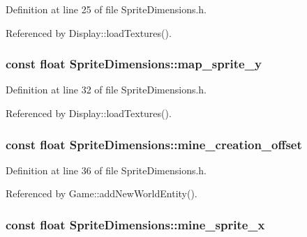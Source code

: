 Definition at line 25 of file Sprite\-Dimensions.\-h.



Referenced by Display\-::load\-Textures().

\hypertarget{classSpriteDimensions_a33014d94b303afe312e1a4b2fb5e437f}{
\subsubsection[{map\-\_\-sprite\-\_\-y}]{\setlength{\rightskip}{0pt plus 5cm}const float Sprite\-Dimensions\-::map\-\_\-sprite\-\_\-y}}\label{classSpriteDimensions_a33014d94b303afe312e1a4b2fb5e437f}


Definition at line 32 of file Sprite\-Dimensions.\-h.



Referenced by Display\-::load\-Textures().

\hypertarget{classSpriteDimensions_a01c7c9dc1498f3336671b1ca697a7342}{
\subsubsection[{mine\-\_\-creation\-\_\-offset}]{\setlength{\rightskip}{0pt plus 5cm}const float Sprite\-Dimensions\-::mine\-\_\-creation\-\_\-offset}}\label{classSpriteDimensions_a01c7c9dc1498f3336671b1ca697a7342}


Definition at line 36 of file Sprite\-Dimensions.\-h.



Referenced by Game\-::add\-New\-World\-Entity().

\hypertarget{classSpriteDimensions_af7f442b00b4a2d9d8b9ad47371a0018f}{
\subsubsection[{mine\-\_\-sprite\-\_\-x}]{\setlength{\rightskip}{0pt plus 5cm}const float Sprite\-Dimensions\-::mine\-\_\-sprite\-\_\-x}}\label{classSpriteDimensions_af7f442b00b4a2d9d8b9ad47371a0018f}


